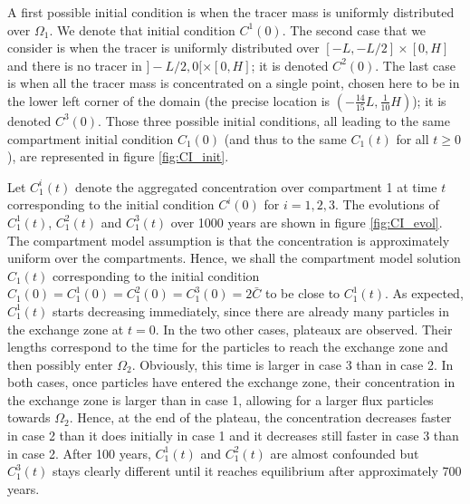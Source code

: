 A first possible initial condition is when the tracer mass is uniformly distributed over $\Omega_1$. We denote that initial condition $C^1(0)$. The second case that we consider is when the tracer is uniformly distributed over $[-L,-L/2]\times[0,H]$ and there is no tracer in $]-L/2,0[\times[0,H]$; it is denoted $C^2(0)$. The last case is when all the tracer mass is concentrated on a single point, chosen here to be in the lower left corner of the domain (the precise location is $(-\frac{14}{15}L,\frac{1}{10}H)$); it is denoted $C^3(0)$. Those three possible initial conditions, all leading to the same compartment initial condition $C_1(0)$ (and thus to the same $C_1(t)$ for all $t \ge 0$), are represented in figure \ref{fig:CI_init}. 

Let $C_1^i(t)$ denote the aggregated concentration over compartment 1 at time $t$ corresponding to the initial condition $C^i(0)$ for $i = 1,2,3$. The evolutions of $C^1_1(t)$, $C^2_1(t)$ and $C^3_1(t)$ over 1000 years are shown in figure \ref{fig:CI_evol}. The compartment model assumption is that the concentration is approximately uniform over the compartments. Hence, we shall the compartment model solution $C_1(t)$ corresponding to the initial condition $C_1(0) = C^1_1(0) = C^2_1(0) = C^3_1(0) = 2\bar C$ to be close to $C^1_1(t)$. As expected, $C_1^1(t)$ starts decreasing immediately, since there are already many particles in the exchange zone at $t=0$. In the two other cases, plateaux are observed. Their lengths correspond to the time for the particles to reach the exchange zone and then possibly enter $\Omega_2$. Obviously, this time is larger in case 3 than in case 2. In both cases, once particles have entered the exchange zone, their concentration in the exchange zone is larger than in case 1, allowing for a larger flux particles towards $\Omega_2$. Hence, at the end of the plateau, the concentration decreases faster in case 2 than it does initially in case 1 and it decreases still faster in case 3 than in case 2. After 100 years, $C^1_1(t)$ and $C^2_1(t)$ are almost confounded but $C^3_1(t)$ stays clearly different until it reaches equilibrium after approximately 700 years.

